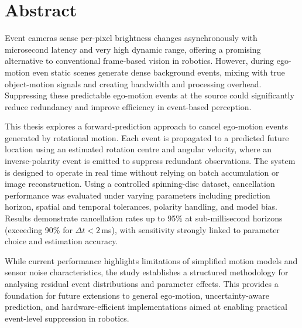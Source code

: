 \chapter*{Abstract}

Event cameras sense per-pixel brightness changes asynchronously with microsecond latency and very high dynamic range, offering a promising alternative to conventional frame-based vision in robotics. However, during ego-motion even static scenes generate dense background events, mixing with true object-motion signals and creating bandwidth and processing overhead. Suppressing these predictable ego-motion events at the source could significantly reduce redundancy and improve efficiency in event-based perception.

This thesis explores a forward-prediction approach to cancel ego-motion events generated by rotational motion. Each event is propagated to a predicted future location using an estimated rotation centre and angular velocity, where an inverse-polarity event is emitted to suppress redundant observations. The system is designed to operate in real time without relying on batch accumulation or image reconstruction. Using a controlled spinning-disc dataset, cancellation performance was evaluated under varying parameters including prediction horizon, spatial and temporal tolerances, polarity handling, and model bias. Results demonstrate cancellation rates up to 95\% at sub-millisecond horizons (exceeding 90\% for $\Delta t<2$\,ms), with sensitivity strongly linked to parameter choice and estimation accuracy. 

While current performance highlights limitations of simplified motion models and sensor noise characteristics, the study establishes a structured methodology for analysing residual event distributions and parameter effects. This provides a foundation for future extensions to general ego-motion, uncertainty-aware prediction, and hardware-efficient implementations aimed at enabling practical event-level suppression in robotics.
